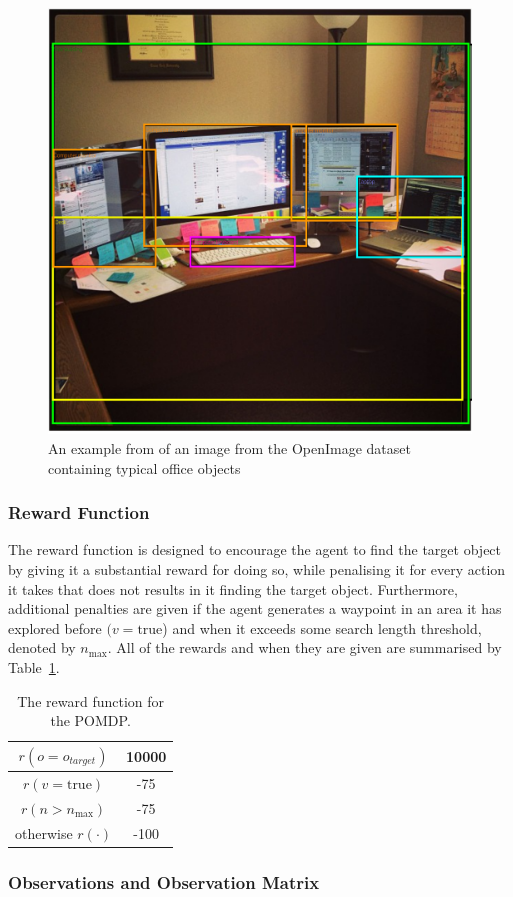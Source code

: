 \documentclass[runningheads]{llncs}
\begin{document}
\begin{figure}
  \centering
  \includegraphics[width=0.5\columnwidth]{figures/desk_example.png}
  \caption{An example from of an image from the OpenImage dataset~\cite{openimages} containing typical office objects}\label{fig:openimage}
\end{figure}

\subsubsection{Reward Function}

The reward function is designed to encourage the agent to find the target object by giving it a substantial reward for doing so, while penalising it for every action it takes that does not results in it finding the target object.
Furthermore, additional penalties are given if the agent generates a waypoint in an area it has explored before $(v = \textrm{true}$) and when it exceeds some search length threshold, denoted by $n_{\max}$.
All of the rewards and when they are given are summarised by Table~\ref{tab:rewards}.

\begin{table}
  \centering
  \caption{The reward function for the POMDP. }\label{tab:rewards}
  \begin{tabular}{cc}
    \toprule
    $r(o = o_{target})$ & 10000 \\ \midrule
    $r(v = \textrm{true})$  & -75 \\ \midrule
    $r(n > n_{\max})$ & -75 \\ \midrule
    otherwise $r(\cdot)$ & -100  \\ \midrule
    \bottomrule
  \end{tabular}
\end{table}

\subsubsection{Observations and Observation Matrix}
\end{document}
